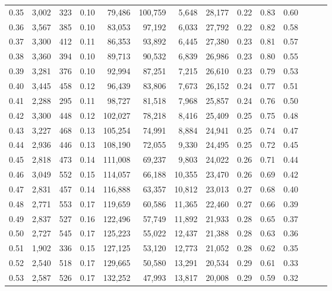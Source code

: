 \begin{tabular}{rrrrrrrrrrrrrr}
0.35 &  3,002 &  323 &  0.10 &   79,486 &  100,759 &   5,648 &  28,177 &  0.22 &  0.83 &      0.60 \\
0.36 &  3,567 &  385 &  0.10 &   83,053 &   97,192 &   6,033 &  27,792 &  0.22 &  0.82 &      0.58 \\
0.37 &  3,300 &  412 &  0.11 &   86,353 &   93,892 &   6,445 &  27,380 &  0.23 &  0.81 &      0.57 \\
0.38 &  3,360 &  394 &  0.10 &   89,713 &   90,532 &   6,839 &  26,986 &  0.23 &  0.80 &      0.55 \\
0.39 &  3,281 &  376 &  0.10 &   92,994 &   87,251 &   7,215 &  26,610 &  0.23 &  0.79 &      0.53 \\
0.40 &  3,445 &  458 &  0.12 &   96,439 &   83,806 &   7,673 &  26,152 &  0.24 &  0.77 &      0.51 \\
0.41 &  2,288 &  295 &  0.11 &   98,727 &   81,518 &   7,968 &  25,857 &  0.24 &  0.76 &      0.50 \\
0.42 &  3,300 &  448 &  0.12 &  102,027 &   78,218 &   8,416 &  25,409 &  0.25 &  0.75 &      0.48 \\
0.43 &  3,227 &  468 &  0.13 &  105,254 &   74,991 &   8,884 &  24,941 &  0.25 &  0.74 &      0.47 \\
0.44 &  2,936 &  446 &  0.13 &  108,190 &   72,055 &   9,330 &  24,495 &  0.25 &  0.72 &      0.45 \\
0.45 &  2,818 &  473 &  0.14 &  111,008 &   69,237 &   9,803 &  24,022 &  0.26 &  0.71 &      0.44 \\
0.46 &  3,049 &  552 &  0.15 &  114,057 &   66,188 &  10,355 &  23,470 &  0.26 &  0.69 &      0.42 \\
0.47 &  2,831 &  457 &  0.14 &  116,888 &   63,357 &  10,812 &  23,013 &  0.27 &  0.68 &      0.40 \\
0.48 &  2,771 &  553 &  0.17 &  119,659 &   60,586 &  11,365 &  22,460 &  0.27 &  0.66 &      0.39 \\
0.49 &  2,837 &  527 &  0.16 &  122,496 &   57,749 &  11,892 &  21,933 &  0.28 &  0.65 &      0.37 \\
0.50 &  2,727 &  545 &  0.17 &  125,223 &   55,022 &  12,437 &  21,388 &  0.28 &  0.63 &      0.36 \\
0.51 &  1,902 &  336 &  0.15 &  127,125 &   53,120 &  12,773 &  21,052 &  0.28 &  0.62 &      0.35 \\
0.52 &  2,540 &  518 &  0.17 &  129,665 &   50,580 &  13,291 &  20,534 &  0.29 &  0.61 &      0.33 \\
0.53 &  2,587 &  526 &  0.17 &  132,252 &   47,993 &  13,817 &  20,008 &  0.29 &  0.59 &      0.32 \\

\end{tabular}
